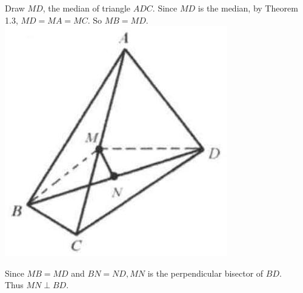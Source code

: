 \documentclass{article}
\begin{document}
Draw \(M D\), the median of triangle \(A D C\). Since \(M D\) is the median, by Theorem 1.3, \(M D=M A=M C\). So \(M B=M D\).\\
\centering
\includegraphics[width=\textwidth]{images/reasoning_image_1.jpg}


Since \(M B=M D\) and \(B N=N D, M N\) is the perpendicular bisector of \(B D\).\\
Thus \(M N \perp B D\).
\end{document}
